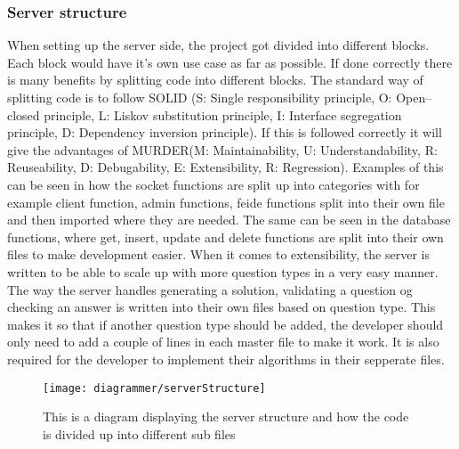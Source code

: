 \subsubsection{Server structure}
When setting up the server side, the project got divided into different blocks. Each block would have it's own use case as far as possible. If done correctly there is many benefits by splitting code into different blocks. The standard way of splitting code is to follow SOLID (S: Single responsibility principle, O: Open–closed principle, L: Liskov substitution principle, I: Interface segregation principle, D: Dependency inversion principle). If this is followed correctly it will give the advantages of MURDER(M: Maintainability, U: Understandability, R: Reuseability, D: Debugability, E: Extensibility, R: Regression). Examples of this can be seen in how the socket functions are split up into categories with for example client function, admin functions, feide functions split into their own file and then imported where they are needed. The same can be seen in the database functions, where get, insert, update and delete functions are split into their own files to make development easier. When it comes to extensibility, the server is written to be able to scale up with more question types in a very easy manner. The way the server handles generating a solution, validating a question og checking an answer is written into their own files based on question type. This makes it so that if another question type should be added, the developer should only need to add a couple of lines in each master file to make it work. It is also required for the developer to implement their algorithms in their sepperate files.
\begin{figure}[h]
    \centering
    \texttt{[image: diagrammer/serverStructure]}
    \caption{This is a diagram displaying the server structure and how the code is divided up into different sub files}
    \label{fig:serverStructure}
\end{figure}